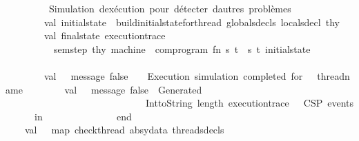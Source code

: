 \begin{isabellebody}
\isanewline
\ \ \ \ \ \ \ \ {\isacharparenleft}{\kern0pt}{\isacharasterisk}{\kern0pt}\ Simulation\ d{\isacharprime}{\kern0pt}exécution\ pour\ détecter\ d{\isacharprime}{\kern0pt}autres\ problèmes\ {\isacharasterisk}{\kern0pt}{\isacharparenright}{\kern0pt}\isanewline
\ \ \ \ \ \ \ \ val\ initial{\isacharunderscore}{\kern0pt}state\ {\isacharequal}{\kern0pt}\ build{\isacharunderscore}{\kern0pt}initial{\isacharunderscore}{\kern0pt}state{\isacharunderscore}{\kern0pt}for{\isacharunderscore}{\kern0pt}thread\ globals{\isacharunderscore}{\kern0pt}decls\ locals{\isacharunderscore}{\kern0pt}decl\ thy\isanewline
\ \ \ \ \ \ \ \ val\ {\isacharparenleft}{\kern0pt}final{\isacharunderscore}{\kern0pt}state{\isacharcomma}{\kern0pt}\ execution{\isacharunderscore}{\kern0pt}trace{\isacharparenright}{\kern0pt}\ {\isacharequal}{\kern0pt}\ \isanewline
\ \ \ \ \ \ \ \ \ \ sem{\isacharunderscore}{\kern0pt}step\ thy\ machine\ \ com{\isacharunderscore}{\kern0pt}program\ {\isacharparenleft}{\kern0pt}fn\ {\isacharparenleft}{\kern0pt}s{\isacharcomma}{\kern0pt}\ t{\isacharparenright}{\kern0pt}\ {\isacharequal}{\kern0pt}{\isachargreater}{\kern0pt}\ {\isacharparenleft}{\kern0pt}s{\isacharcomma}{\kern0pt}\ t{\isacharparenright}{\kern0pt}{\isacharparenright}{\kern0pt}\ {\isacharparenleft}{\kern0pt}initial{\isacharunderscore}{\kern0pt}state{\isacharcomma}{\kern0pt}\ {\isacharbrackleft}{\kern0pt}{\isacharbrackright}{\kern0pt}{\isacharparenright}{\kern0pt}\isanewline
\ \ \ \ \ \ \ \ \isanewline
\ \ \ \ \ \ \ \ val\ {\isacharunderscore}{\kern0pt}\ {\isacharequal}{\kern0pt}\ message\ false\ {\isacharparenleft}{\kern0pt}{\isachardoublequote}{\kern0pt}\ \ {\isasymcheckmark}\ Execution\ simulation\ completed\ for\ {\isachardoublequote}{\kern0pt}\ {\isacharcircum}{\kern0pt}\ thread{\isacharunderscore}{\kern0pt}name{\isacharparenright}{\kern0pt}\isanewline
\ \ \ \ \ \ \ \ val\ {\isacharunderscore}{\kern0pt}\ {\isacharequal}{\kern0pt}\ message\ false\ {\isacharparenleft}{\kern0pt}{\isachardoublequote}{\kern0pt}\ Generated\ {\isachardoublequote}{\kern0pt}\ {\isacharcircum}{\kern0pt}\ \isanewline
\ \ \ \ \ \ \ \ \ \ \ \ \ \ \ \ \ \ \ \ \ \ \ \ \ \ \ \ \ Int{\isachardot}{\kern0pt}toString\ {\isacharparenleft}{\kern0pt}length\ execution{\isacharunderscore}{\kern0pt}trace{\isacharparenright}{\kern0pt}\ {\isacharcircum}{\kern0pt}\ {\isachardoublequote}{\kern0pt}\ CSP\ events{\isachardoublequote}{\kern0pt}{\isacharparenright}{\kern0pt}\isanewline
\ \ \ \ \ \ in\isanewline
\ \ \ \ \ \ \ \ {\isacharparenleft}{\kern0pt}{\isacharparenright}{\kern0pt}\isanewline
\ \ \ \ \ \ end\isanewline
\ \ \ \ \isanewline
\ \ \ \ val\ {\isacharunderscore}{\kern0pt}\ {\isacharequal}{\kern0pt}\ map\ {\isacharparenleft}{\kern0pt}check{\isacharunderscore}{\kern0pt}thread\ absy{\isacharunderscore}{\kern0pt}data{\isacharparenright}{\kern0pt}\ {\isacharparenleft}{\kern0pt}threads{\isacharunderscore}{\kern0pt}decls{\isacharparenright}{\kern0pt}\isanewline

\end{isabellebody}
